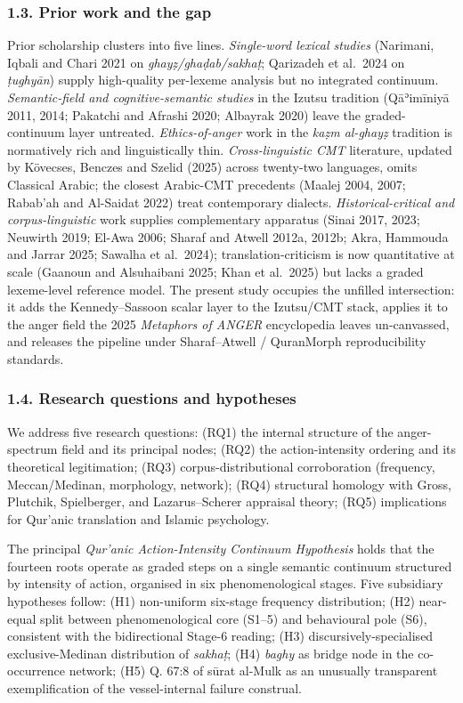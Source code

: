 \documentclass[11pt,a4paper]{article}
\begin{document}
\subsubsection{1.3. Prior work and the
gap}\label{prior-work-and-the-gap}

Prior scholarship clusters into five lines. \emph{Single-word lexical
studies} (Narimani, Iqbali and Chari 2021 on \emph{ghayẓ/ghaḍab/sakhaṭ};
Qarizadeh et al.~2024 on \emph{ṭughyān}) supply high-quality per-lexeme
analysis but no integrated continuum. \emph{Semantic-field and
cognitive-semantic studies} in the Izutsu tradition (Qāʾimīniyā 2011,
2014; Pakatchi and Afrashi 2020; Albayrak 2020) leave the
graded-continuum layer untreated. \emph{Ethics-of-anger} work in the
\emph{kaẓm al-ghayẓ} tradition is normatively rich and linguistically
thin. \emph{Cross-linguistic CMT} literature, updated by Kövecses,
Benczes and Szelid (2025) across twenty-two languages, omits Classical
Arabic; the closest Arabic-CMT precedents (Maalej 2004, 2007; Rabab'ah
and Al-Saidat 2022) treat contemporary dialects.
\emph{Historical-critical and corpus-linguistic} work supplies
complementary apparatus (Sinai 2017, 2023; Neuwirth 2019; El-Awa 2006;
Sharaf and Atwell 2012a, 2012b; Akra, Hammouda and Jarrar 2025; Sawalha
et al.~2024); translation-criticism is now quantitative at scale
(Gaanoun and Alsuhaibani 2025; Khan et al.~2025) but lacks a graded
lexeme-level reference model. The present study occupies the unfilled
intersection: it adds the Kennedy--Sassoon scalar layer to the
Izutsu/CMT stack, applies it to the anger field the 2025 \emph{Metaphors
of ANGER} encyclopedia leaves un-canvassed, and releases the pipeline
under Sharaf--Atwell / QuranMorph reproducibility standards.

\subsubsection{1.4. Research questions and
hypotheses}\label{research-questions-and-hypotheses}

We address five research questions: (RQ1) the internal structure of the
anger-spectrum field and its principal nodes; (RQ2) the action-intensity
ordering and its theoretical legitimation; (RQ3) corpus-distributional
corroboration (frequency, Meccan/Medinan, morphology, network); (RQ4)
structural homology with Gross, Plutchik, Spielberger, and
Lazarus--Scherer appraisal theory; (RQ5) implications for Qur'anic
translation and Islamic psychology.

The principal \emph{Qur'anic Action-Intensity Continuum Hypothesis}
holds that the fourteen roots operate as graded steps on a single
semantic continuum structured by intensity of action, organised in six
phenomenological stages. Five subsidiary hypotheses follow: (H1)
non-uniform six-stage frequency distribution; (H2) near-equal split
between phenomenological core (S1--5) and behavioural pole (S6),
consistent with the bidirectional Stage-6 reading; (H3)
discursively-specialised exclusive-Medinan distribution of
\emph{sakhaṭ}; (H4) \emph{baghy} as bridge node in the co-occurrence
network; (H5) Q. 67:8 of sūrat al-Mulk as an unusually transparent
exemplification of the vessel-internal failure construal.
\end{document}
